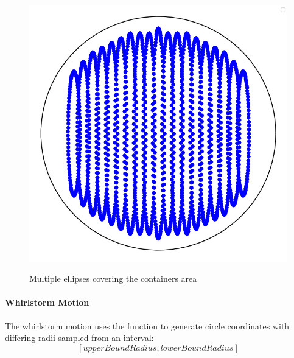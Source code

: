 \begin{figure}[H]
    \includegraphics[scale=0.35]{Graphics/motions/horizontal_elliptical.png}
    \centering
    \label{fig:foldingMotion1}
    \caption{Multiple ellipses covering the containers area}
\end{figure}


\paragraph{Whirlstorm Motion}
The whirlstorm motion uses the function to generate circle coordinates  with differing radii sampled from an interval:
\[[upperBoundRadius, lowerBoundRadius]\]

